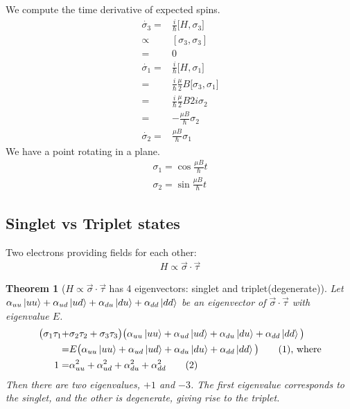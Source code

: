 \documentclass[]{article}
\newcommand\numberthis{\addtocounter{equation}{1}\tag{\theequation}}
\newtheorem{thm}{Theorem}
\begin{document}
We compute the time derivative of expected spins.
\begin{align*}
	\dot{\sigma_3} =& \frac{i}{\hbar} \big[H,\sigma_3\big]\\
	\propto& [\sigma_3,\sigma_3] \\
	=& 0\\
	\dot{\sigma_1} =& \frac{i}{\hbar} \big[H,\sigma_1\big]\\
	=& \frac{i}{\hbar} \frac{\mu}{2} B \big[\sigma_3,\sigma_1\big]\\
	=& \frac{i}{\hbar} \frac{\mu}{2} B 2 i \sigma_2\\
	=& - \frac{\mu B}{\hbar} \sigma_2\\
	\dot{\sigma_2} =&  \frac{\mu B}{\hbar} \sigma_1
\end{align*}
We have a point rotating in a plane.
\begin{align*}
	\sigma_1 = \cos{\frac{\mu B}{\hbar} t}\\
	\sigma_2 = \sin{\frac{\mu B}{\hbar} t}
\end{align*}


\subsection{Singlet vs Triplet states}

Two electrons providing fields for each other:
\begin{align*}
	H \propto \vec{\sigma} \cdot \vec{\tau}
\end{align*}
\begin{thm}	[$H \propto \vec{\sigma} \cdot \vec{\tau}$ has 4 eigenvectors: singlet and triplet(degenerate)]
	Let $\alpha_{uu}\ket{uu} + \alpha_{ud}\ket{ud} +\alpha_{du}\ket{du} + \alpha_{dd}\ket{dd}$ be an eigenvector of $\vec{\sigma} \cdot \vec{\tau}$ with eigenvalue $E$.
	\begin{align*}
		\big(\sigma_1\tau_1 +& \sigma_2\tau_2 + \sigma_3\tau_3\big) \big(\alpha_{uu}\ket{uu} + 	\alpha_{ud}\ket{ud} +\alpha_{du}\ket{du} + \alpha_{dd}\ket{dd}\big) \\=& E \big(\alpha_{uu}\ket{uu} + \alpha_{ud}\ket{ud} +\alpha_{du}\ket{du} + \alpha_{dd}\ket{dd}\big) \numberthis \label{eq:ev_sigma_tau} \text{, where}\\
		1 =& \alpha_{uu}^2 + \alpha_{ud}^2 +\alpha_{du}^2 + \alpha_{dd}^2 \numberthis \label{eq:norm:alpha}
	\end{align*}
Then there are two eigenvalues, $+1$ and $-3$. The first eigenvalue corresponds to the singlet, and the other is degenerate, giving rise to the triplet.
\end{thm}
\end{document}
